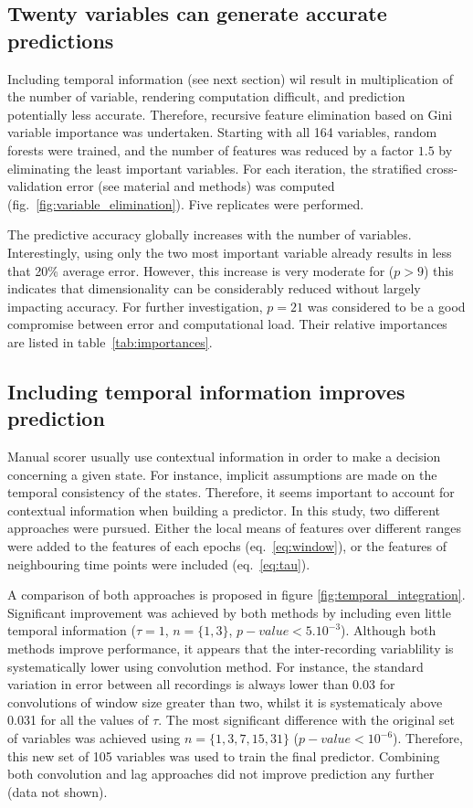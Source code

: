 \subsection{Twenty variables can generate accurate predictions}
Including temporal information (see next section) wil result in multiplication of the number of variable, rendering computation difficult, and prediction potentially less accurate.
Therefore, recursive feature elimination\cite{menze_comparison_2009} based on
Gini variable importance was undertaken.
Starting with all 164 variables, random forests were trained, and the number of features was reduced by a factor $1.5$  by eliminating the least important variables.
For each iteration, the stratified cross-validation error (see material and methods) was computed (fig.~\ref{fig:variable_elimination}). Five replicates were performed.


The predictive accuracy globally increases with the number of variables.
Interestingly, using only the two most important variable already results in less that 20\% average error.
However, this increase is very moderate for ($p>9$) this indicates that dimensionality can be considerably reduced without largely impacting accuracy.
For further investigation, $p=21$ was considered to be a good compromise between error and computational load. Their relative importances are listed in table~\ref{tab:importances}.


\subsection{Including temporal information improves prediction}
Manual scorer usually use contextual information in order to make a decision concerning a given state.
For instance, implicit assumptions are made on the temporal consistency of the states.
Therefore, it seems important to account for contextual information when building a predictor.
In this study, two different approaches were pursued.
Either the local means of features over different ranges were added to the features
of each epochs (eq.~\ref{eq:window}),
or the features of neighbouring time points were included (eq.~\ref{eq:tau}).

A comparison of both approaches is proposed in figure \ref{fig:temporal_integration}.
Significant improvement was achieved by both methods by including even little temporal information ($\tau = 1$, $n=\{1,3\}$, $p-value < 5.10^{-3}$).
Although both methods improve performance, it appears that the inter-recording variablility is systematically lower using convolution method.
For instance, the standard variation in error between all recordings is always lower than 0.03 for convolutions of window size greater than two,
whilst it is systematicaly above 0.031 for all the values of $\tau$.
The most significant difference with the original set of variables was achieved using $n = \{1,3,7,15,31\}$ ($p-value < 10^{-6}$).
Therefore, this new set of 105 variables was used to train the final predictor.
Combining both convolution and lag approaches did not improve prediction any further (data not shown).

